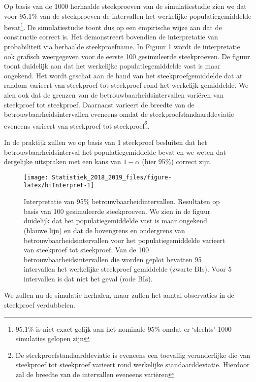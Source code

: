 \documentclass[12pt,dutch,coursenotes]{book}
\let\rmarkdownfootnote\footnote%
\def\footnote{\protect\rmarkdownfootnote}
\theoremstyle{definition}
\theoremstyle{definition}
\theoremstyle{definition}
\theoremstyle{remark}
\begin{document}
Op basis van de 1000 herhaalde steekproeven van de simulatiestudie zien
we dat voor 95.1\% van de steekproeven de intervallen het werkelijke
populatiegemiddelde bevat\footnote{95.1\% is niet exact gelijk aan het
  nominale 95\% omdat er `slechts' 1000 simulaties gelopen zijn}. De
simulatiestudie toont dus op een empirische wijze aan dat de constructie
correct is. Het demonstreert bovendien de interpretatie van
probabiliteit via herhaalde steekproefname. In Figuur
\ref{fig:biInterpret} wordt de interpretatie ook grafisch weergegeven
voor de eerste 100 gesimuleerde steekproeven. De figuur toont duidelijk
aan dat het werkelijke populatiegemiddelde vast is maar ongekend. Het
wordt geschat aan de hand van het steekproefgemiddelde dat at random
varieert van steekproef tot steekproef rond het werkelijk gemiddelde. We
zien ook dat de grenzen van de betrouwbaarheidsintervallen variëren van
steekproef tot steekproef. Daarnaast varieert de breedte van de
betrouwbaarheidsintervallen eveneens omdat de
steekproefstandaarddeviatie eveneens varieert van steekproef tot
steekproef\footnote{De steekproefstandaarddeviatie is eveneens een
  toevallig veranderlijke die van steekproef tot steekproef varieert
  rond werkelijke standaarddeviatie. Hierdoor zal de breedte van de
  intervallen eveneens variëren}.

In de praktijk zullen we op basis van 1 steekproef besluiten dat het
betrouwbaarheidsinterval het populatiegemiddelde bevat en we weten dat
dergelijke uitspraken met een kans van \(1-\alpha\) (hier 95\%) correct
zijn.

\begin{figure}

{\centering \texttt{[image: Statistiek\_2018\_2019\_files/figure-latex/biInterpret-1]} 

}

\caption{Interpretatie van 95$\%$ betrouwbaarheidintervallen. Resultaten op basis van 100 gesimuleerde steekproeven. We zien in de figuur duidelijk dat het populatiegemiddelde vast is maar ongekend (blauwe lijn) en dat de bovengrens en ondergrens van betrouwbaarheidsintervallen voor het populatiegemiddelde varieert van steekproef tot steekproef. Van de 100 betrouwbaarheidsintervallen die worden geplot bevatten 95 intervallen het werkelijke steekproef gemiddelde (zwarte BIs). Voor 5 intervallen is dat niet het geval (rode BIs).}\label{fig:biInterpret}
\end{figure}

We zullen nu de simulatie herhalen, maar zullen het aantal observaties
in de steekproef verdubbelen.
\end{document}
